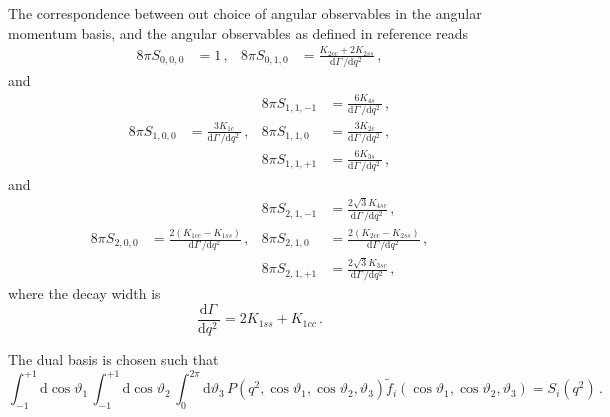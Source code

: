 \documentclass[aps,nofootinbib,preprintnumbers,prd,twocolumn]{revtex4-1}
\newcommand{\dual}[1]{\tilde{#1}}
\newcommand{\rmdx}[1]{\mbox{d} #1 \,} %
\renewcommand{\theta}{\vartheta}
\begin{document}
\begin{widetext}
The correspondence between out choice of angular observables in the angular momentum basis, and the angular
observables as defined in reference \cite{Boeer:2014xx} reads
\begin{equation}
\begin{aligned}
    8\pi S_{0, 0,  0} & = 1\,,                                                             &
    8\pi S_{0, 1,  0} & = \frac{K_{2cc} + 2 K_{2ss}}{\rmdx\Gamma/\rmdx{q^2}}\,,
\end{aligned}
\end{equation}
and
\begin{equation}
\begin{aligned}
%
                      &                                                                    &
    8\pi S_{1, 1, -1} & = \frac{6 K_{4s}}{\rmdx\Gamma/\rmdx{q^2}}\,,                       \\
%
    8\pi S_{1, 0,  0} & = \frac{3 K_{1c}}{\rmdx\Gamma/\rmdx{q^2}}\,,                       &
    8\pi S_{1, 1,  0} & = \frac{3 K_{2c}}{\rmdx\Gamma/\rmdx{q^2}}\,,                       \\
%
                      &                                                                    &
    8\pi S_{1, 1, +1} & = \frac{6 K_{3s}}{\rmdx\Gamma/\rmdx{q^2}}\,,
\end{aligned}
\end{equation}
and
\begin{equation}
\begin{aligned}
%
                      &                                                                    &
    8\pi S_{2, 1, -1} & = \frac{2 \sqrt{3} K_{4sc}}{\rmdx\Gamma/\rmdx{q^2}}\,,             \\
%
    8\pi S_{2, 0,  0} & = \frac{2(K_{1cc} - K_{1ss})}{\rmdx\Gamma/\rmdx{q^2}}\,,           &
    8\pi S_{2, 1,  0} & = \frac{2(K_{2cc} - K_{2ss})}{\rmdx\Gamma/\rmdx{q^2}}\,,           \\
%
                      &                                                                    &
    8\pi S_{2, 1, +1} & = \frac{2 \sqrt{3} K_{3sc}}{\rmdx\Gamma/\rmdx{q^2}}\,,
\end{aligned}
\end{equation}
where the decay width is
\begin{equation}
    \frac{\rmdx{\Gamma}} {\rmdx{q^2}} = 2 K_{1ss} + K_{1cc}\,.
\end{equation}

The dual basis is chosen such that
\begin{equation}
    \int_{-1}^{+1} \rmdx{\cos \theta_1} \int_{-1}^{+1} \rmdx{\cos \theta_2} \int_0^{2\pi} \rmdx{\theta_3} P(q^2, \cos \theta_1, \cos \theta_2, \theta_3) \dual{f}_i(\cos \theta_1, \cos \theta_2, \theta_3) = S_i(q^2)\,.
\end{equation}
\end{widetext}
\end{document}
